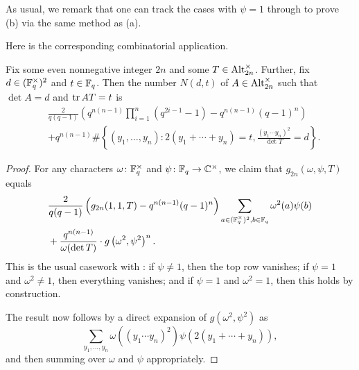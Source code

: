 \begin{remark}
    As usual, we remark that one can track the cases with $\psi=1$ through  to prove (b) via the same method as (a).
\end{remark}
Here is the corresponding combinatorial application.
\begin{corollary} \label{cor:count-alt}
    Fix some even nonnegative integer $2n$ and some $T\in\operatorname{Alt}_{2n}^\times$. Further, fix $d\in(\mathbb F_q^{\times})^2$ and $t\in\mathbb F_q$. Then the number $N(d,t)$ of $A\in\operatorname{Alt}_{2n}^\times$ such that $\det A=d$ and $\operatorname{tr} AT=t$ is
    \begin{align*}
        &\frac2{q(q-1)}\left(q^{n(n-1)}\prod_{i=1}^{n}\left(q^{2i-1}-1\right)-q^{n(n-1)}(q-1)^n\right) \\
        &+ q^{n(n-1)}\#\left\{(y_1,\ldots,y_n):2(y_1+\cdots+y_n)=t,\frac{(y_1\cdots y_n)^2}{\det T}=d\right\}.
    \end{align*}
\end{corollary}
\begin{proof}
    For any characters $\omega\colon\mathbb F_q^\times$ and $\psi\colon\mathbb F_q\to\mathbb C^\times$, we claim that $g_{2n}(\omega,\psi,T)$ equals
    \begin{align*}
        &\frac 2{q(q-1)}
        \left(g_{2n}(1,1,T)-q^{n(n-1)}(q-1)^n\right)\sum_{a\in(\mathbb F_q^{\times})^2,b\in\mathbb F_q}\omega^2(a)\psi(b) \\
        &+\frac{q^{n(n-1)}}{\omega(\det T)}\cdot g\left(\omega^2,\psi^2\right)^n.
    \end{align*}
    This is the usual casework with : if $\psi\ne1$, then the top row vanishes; if $\psi=1$ and $\omega^2\ne1$, then everything vanishes; and if $\psi=1$ and $\omega^2=1$, then this holds by construction.

    The result now follows by a direct expansion of $g\left(\omega^2,\psi^2\right)$
    as
    \[\sum_{y_1,\ldots,y_n}\omega\left((y_1\cdots y_n)^2\right)\psi(2(y_1+\cdots+y_n)),\]
    and then summing over $\omega$ and $\psi$ appropriately.
\end{proof}


